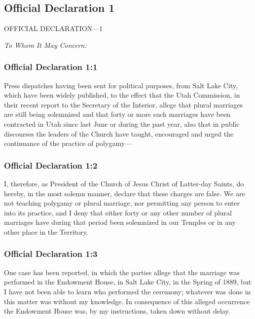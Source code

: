 \subsection{Official Declaration 1}
	\label{OD1}
	
	 OFFICIAL DECLARATION—1

	\textit{To Whom It May Concern:}
	
	\subsubsection{Official Declaration 1:1} %
		\label{OD1-1}
		
		Press dispatches having been sent for political purposes, from Salt Lake City, which have been widely published, to the effect that the Utah Commission, in their recent report to the Secretary of the Interior, allege that plural marriages are still being solemnized and that forty or more such marriages have been contracted in Utah since last June or during the past year, also that in public discourses the leaders of the Church have taught, encouraged and urged the continuance of the practice of polygamy—
		
	\subsubsection{Official Declaration 1:2} %
		\label{OD1-2}
		
		I, therefore, as President of the Church of Jesus Christ of Latter-day Saints, do hereby, in the most solemn manner, declare that these charges are false.  We are not teaching polygamy or plural marriage, nor permitting any person to enter into its practice, and I deny that either forty or any other number of plural marriages have during that period been solemnized in our Temples or in any other place in the Territory.
		
	\subsubsection{Official Declaration 1:3} %
		\label{OD1-3}
		
		One case has been reported, in which the parties allege that the marriage was performed in the Endowment House, in Salt Lake City, in the Spring of 1889, but I have not been able to learn who performed the ceremony; whatever was done in this matter was without my knowledge.  In consequence of this alleged occurrence the Endowment House was, by my instructions, taken down without delay.
		
